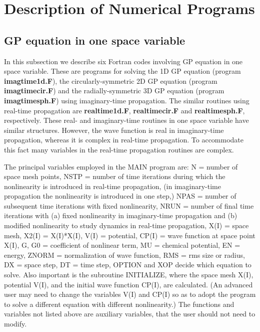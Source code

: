 \documentclass[onecolumn]{elsart3p}
\begin{document}
\section{Description of Numerical Programs}
\label{FOR}


\subsection{GP equation in one space variable}

In this subsection we describe six  Fortran  codes involving GP equation in one
space variable. These are programs for solving the 1D GP equation (program {\bf
imagtime1d.F}), the circularly-symmetric 2D GP equation (program {\bf
imagtimecir.F}) and the radially-symmetric 3D  GP equation  (program {\bf
imagtimesph.F}) using imaginary-time propagation. The similar routines using
real-time propagation are {\bf realtime1d.F}, {\bf realtimecir.F} and {\bf
realtimesph.F}, respectively. These real- and imaginary-time routines in 
one
space variable have similar structures. However, the wave function is real in
imaginary-time propagation, whereas it is complex in real-time propagation. To
accommodate this fact many variables in the real-time propagation routines are
complex.


The principal variables employed in the MAIN program are:  N = number of space
mesh points, NSTP = number of time iterations during which the nonlinearity is
introduced in real-time propagation, (in imaginary-time propagation the
nonlinearity is introduced in one step,) NPAS = number of subsequent time
iterations with fixed nonlinearity, NRUN =  number of final time iterations with
(a) fixed nonlinearity in imaginary-time propagation and (b) modified
nonlinearity to study dynamics in real-time propagation, X(I) = space mesh,
X2(I) = X(I)*X(I), V(I) = potential, CP(I) = wave function at space point X(I),
G, G0 = coefficient of nonlinear term, MU = chemical potential, EN = energy,
ZNORM = normalization of wave function, RMS = rms size or radius, DX = space
step, DT = time step, OPTION and XOP decide which equation to solve. Also
important is the subroutine INITIALIZE, where the space mesh X(I), potential  
V(I), and the initial wave function CP(I), are calculated.  (An advanced user
may need to change the variables V(I) and CP(I) so as to adopt the program to
solve  a different equation with different nonlinearity.) The functions and
variables not listed above are auxiliary variables, that the user should not
need to modify.
\end{document}
